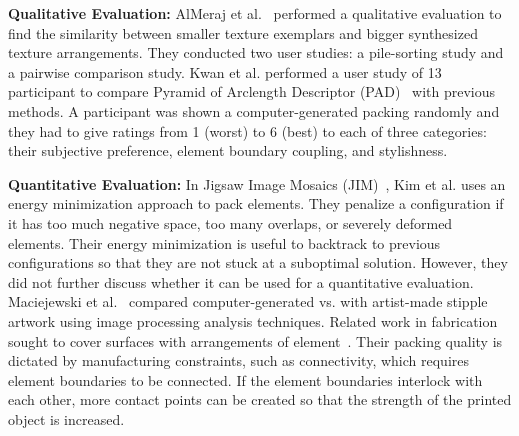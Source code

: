 \newtext
{
\textbf{Qualitative Evaluation:}
AlMeraj et al.~\cite{AlMerajEval2013} performed a qualitative evaluation to find
the similarity between smaller texture exemplars and bigger synthesized texture arrangements.
They conducted two user studies: a pile-sorting study and a pairwise comparison study.
Kwan et al. performed a user study of 13 participant to compare Pyramid of Arclength Descriptor (PAD)~\cite{Kwan2016} 
with previous methods.
A participant was shown a computer-generated packing randomly and they had to give ratings from 1 (worst) to 6 (best)
to each of three categories: their subjective preference, element boundary coupling, and stylishness.
}

\newtext
{
\textbf{Quantitative Evaluation:}
In Jigsaw Image Mosaics (JIM)~\cite{Kim2002}, Kim et al. uses an energy minimization approach
to pack elements. They penalize a configuration if it has too much negative space,
too many overlaps, or severely deformed elements. 
Their energy minimization is useful to backtrack to previous configurations 
so that they are not stuck at a suboptimal solution.
However, they did not further discuss whether it can be used for a quantitative evaluation.
Maciejewski et al.~\cite{Maciejewski2008} compared computer-generated vs.
with artist-made stipple artwork using image processing analysis techniques.
Related work in fabrication sought to cover surfaces with arrangements of element~\cite{Zehnder2016, Chen2017}.
Their packing quality is dictated by manufacturing constraints, such as connectivity, %
which requires element boundaries to be connected.
If the element boundaries interlock with each other, 
more contact points can be created so that the strength of the printed object is increased.}





